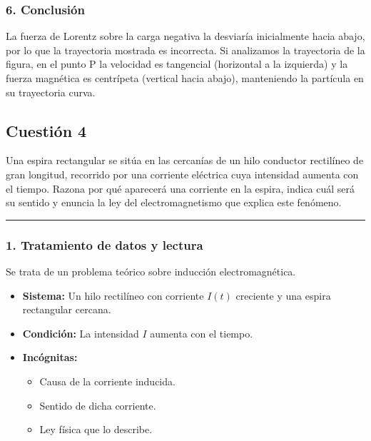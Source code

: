 \subsubsection*{6. Conclusión}
\begin{cajaconclusion}
La fuerza de Lorentz sobre la carga negativa la desviaría inicialmente hacia abajo, por lo que la trayectoria mostrada es incorrecta. Si analizamos la trayectoria de la figura, en el punto P la velocidad es tangencial (horizontal a la izquierda) y la fuerza magnética es centrípeta (vertical hacia abajo), manteniendo la partícula en su trayectoria curva.
\end{cajaconclusion}

\newpage
\subsection{Cuestión 4}
\label{subsec:C4_2021_jul_ext}

\begin{cajaenunciado}
Una espira rectangular se sitúa en las cercanías de un hilo conductor rectilíneo de gran longitud, recorrido por una corriente eléctrica cuya intensidad aumenta con el tiempo. Razona por qué aparecerá una corriente en la espira, indica cuál será su sentido y enuncia la ley del electromagnetismo que explica este fenómeno.
\end{cajaenunciado}
\hrule

\subsubsection*{1. Tratamiento de datos y lectura}
Se trata de un problema teórico sobre inducción electromagnética.
\begin{itemize}
    \item \textbf{Sistema:} Un hilo rectilíneo con corriente $I(t)$ creciente y una espira rectangular cercana.
    \item \textbf{Condición:} La intensidad $I$ aumenta con el tiempo.
    \item \textbf{Incógnitas:}
    \begin{itemize}
        \item Causa de la corriente inducida.
        \item Sentido de dicha corriente.
        \item Ley física que lo describe.
    \end{itemize}
\end{itemize}

